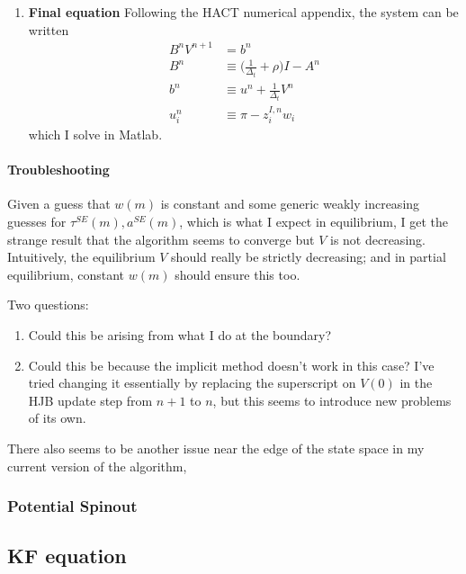 \documentclass[12pt,english]{article}
\theoremstyle{remark}
\begin{document}
\begin{enumerate}
\begin{enumerate}
		\item \textbf{Final equation} Following the HACT numerical appendix, the system can be written 
		\begin{align*}
			B^n V^{n+1} &= b^n \\
			B^n &\equiv \Big( \frac{1}{\Delta_t} + \rho \Big) I - A^n \\
			b^n &\equiv u^n + \frac{1}{\Delta_t} V^{n} \\
			u^n_i &\equiv \pi - z^{I,n}_i w_i 
		\end{align*}
		which I solve in Matlab.
	\end{enumerate}
\end{enumerate}

\paragraph{Troubleshooting}

Given a guess that $w(m)$ is constant and some generic weakly increasing guesses for $\tau^{SE}(m), a^{SE}(m)$, which is what I expect in equilibrium, I get the strange result that the algorithm seems to converge but $V$ is not decreasing. Intuitively, the equilibrium $V$ should really be strictly decreasing; and in partial equilibrium, constant $w(m)$ should ensure this too. 

Two questions:

\begin{enumerate}
	\item Could this be arising from what I do at the boundary? 
	\item Could this be because the implicit method doesn't work in this case? I've tried changing it essentially by replacing the superscript on $V(0)$ in the HJB update step from $n+1$ to $n$, but this seems to introduce new problems of its own. 
\end{enumerate}

There also seems to be another issue near the edge of the state space in my current version of the algorithm, 


 


\subsubsection{Potential Spinout}

\subsection{KF equation}
\end{document}
